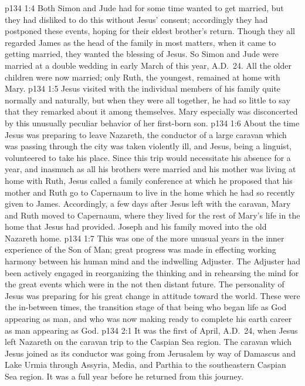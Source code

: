 \vs p134 1:4 Both Simon and Jude had for some time wanted to get married, but they had disliked to do this without Jesus’ consent; accordingly they had postponed these events, hoping for their eldest brother’s return. Though they all regarded James as the head of the family in most matters, when it came to getting married, they wanted the blessing of Jesus. So Simon and Jude were married at a double wedding in early March of this year, A.D.~24. All the older children were now married; only Ruth, the youngest, remained at home with Mary.
\vs p134 1:5 Jesus visited with the individual members of his family quite normally and naturally, but when they were all together, he had so little to say that they remarked about it among themselves. Mary especially was disconcerted by this unusually peculiar behavior of her first\hyp{}born son.
\vs p134 1:6 About the time Jesus was preparing to leave Nazareth, the conductor of a large caravan which was passing through the city was taken violently ill, and Jesus, being a linguist, volunteered to take his place. Since this trip would necessitate his absence for a year, and inasmuch as all his brothers were married and his mother was living at home with Ruth, Jesus called a family conference at which he proposed that his mother and Ruth go to Capernaum to live in the home which he had so recently given to James. Accordingly, a few days after Jesus left with the caravan, Mary and Ruth moved to Capernaum, where they lived for the rest of Mary’s life in the home that Jesus had provided. Joseph and his family moved into the old Nazareth home.
\vs p134 1:7 This was one of the more unusual years in the inner experience of the Son of Man; great progress was made in effecting working harmony between his human mind and the indwelling Adjuster. The Adjuster had been actively engaged in reorganizing the thinking and in rehearsing the mind for the great events which were in the not then distant future. The personality of Jesus was preparing for his great change in attitude toward the world. These were the in\hyp{}between times, the transition stage of that being who began life as God appearing as man, and who was now making ready to complete his earth career as man appearing as God.
\vs p134 2:1 It was the first of April, A.D.~24, when Jesus left Nazareth on the caravan trip to the Caspian Sea region. The caravan which Jesus joined as its conductor was going from Jerusalem by way of Damascus and Lake Urmia through Assyria, Media, and Parthia to the southeastern Caspian Sea region. It was a full year before he returned from this journey.
